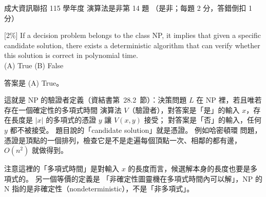\begin{pastexam}[label={px:ncku-115-prog-11}]{成大資訊聯招 115 學年度 演算法是非第 14 題}
（是非；每題 2 分，答錯倒扣 1 分）

[2\%] If a decision problem belongs to the class NP, it implies that given a specific candidate solution,
there exists a deterministic algorithm that can verify whether this solution is correct in polynomial time.\\
(A) True \qquad (B) False
\end{pastexam}

\begin{pastsoln}
答案是 (A) True。

這就是 NP 的驗證者定義（資結書第~28.2~節）：決策問題 $L$ 在 NP 裡，若且唯若存在一個確定性的多項式時間
演算法 $V$（驗證者），對答案是「是」的輸入 $x$，存在長度是 $|x|$ 的多項式的憑證 $y$ 讓 $V(x, y)$ 接受；
對答案是「否」的輸入，任何 $y$ 都不被接受。 題目說的「candidate solution」就是憑證。 例如哈密頓環
問題，憑證是頂點的一個排列，檢查它是不是走遍每個頂點一次、相鄰的都有邊，$O(n^2)$ 就做得到。

注意這裡的「多項式時間」是對輸入 $x$ 的長度而言，候選解本身的長度也要是多項式的。 另一個等價的定義是
「非確定性圖靈機在多項式時間內可以解」，NP 的 N 指的是非確定性（nondeterministic），不是「非多項式」。
\end{pastsoln}
